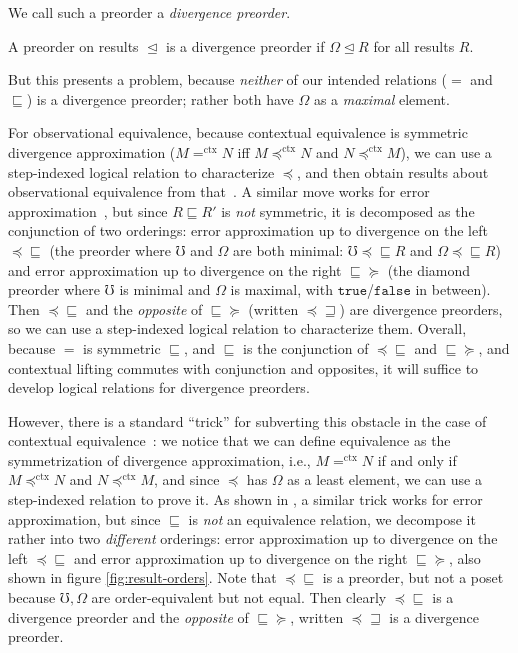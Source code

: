 \documentclass[acmsmall,screen,12pt]{acmart}
\newcommand{\ltdyn}{\sqsubseteq}
\newcommand{\gtdyn}{\sqsupseteq}
\newcommand{\apreorder}{\trianglelefteq}
\newcommand{\ctxize}[1]{\mathrel{{#1}^{\text{ctx}}}}
\newcommand{\tru}{\texttt{true}}
\newcommand{\fls}{\texttt{false}}
\newcommand{\err}{\mho}
\newcommand{\diverge}{\Omega}
\newcommand\errordivergeleft[0]{\preceq\ltdyn}
\newcommand\errordivergeright[0]{\ltdyn\succeq}
\newcommand\errordivergerightop[0]{\preceq\gtdyn}
\begin{document}
{\begin{longonly}
We call such a preorder a \emph{divergence preorder}.
\begin{definition}
  A preorder on results $\apreorder$ is a divergence preorder if
  $\diverge \apreorder R$ for all results $R$.
\end{definition}
\end{longonly}
%
But this presents a problem, because \emph{neither} of our intended
relations ($=$ and $\ltdyn$) is a divergence preorder; rather both have
$\diverge$ as a \emph{maximal} element.
%
\begin{shortonly}
  For observational equivalence, because contextual equivalence is
  symmetric divergence approximation ($M \ctxize= N$ iff $M
  \ctxize\preceq N$ and $N \ctxize\preceq M$), we can use a step-indexed
  logical relation to characterize $\preceq$, and then obtain results
  about observational equivalence from that~\cite{ahmed06:lr}.
  A similar move works for error
  approximation~\cite{newahmed18}, but since $R \ltdyn R'$ is \emph{not} symmetric, it is decomposed as the conjunction of two
  orderings: error approximation up to divergence on the left
  $\errordivergeleft$ (the preorder where $\err$ and $\diverge$ are both
  minimal: $\err \preceq\ltdyn R$ and $\diverge \preceq\ltdyn R$) and
  error approximation up to divergence on the right $\errordivergeright$
  (the diamond preorder where $\err$ is minimal and $\diverge$ is
  maximal, with $\tru$/$\fls$ in between).  Then $\preceq\ltdyn$ and the
  \emph{opposite} of $\ltdyn\succeq$ (written $\errordivergerightop$)
  are divergence preorders, so we can use a step-indexed logical
  relation to characterize them.  Overall, because $=$ is symmetric
  $\ltdyn$, and $\ltdyn$ is the conjunction of $\errordivergeleft$ and
  $\errordivergeright$, and contextual lifting commutes with conjunction
  and opposites, it will suffice to develop logical relations for
  divergence preorders.
\end{shortonly}

\begin{longonly}
However, there is a standard ``trick'' for subverting this obstacle in
the case of contextual equivalence~\cite{ahmed06:lr}: we notice
that we can define equivalence as the symmetrization of divergence
approximation, i.e., $M \ctxize= N$ if and only if $M \ctxize\preceq
N$ and $N \ctxize\preceq M$, and since $\preceq$ has $\diverge$ as
a least element, we can use a step-indexed relation to prove it.
%
As shown in \citet{newahmed18}, a similar trick works for error
approximation, but since $\ltdyn$ is \emph{not} an equivalence
relation, we decompose it rather into two \emph{different} orderings:
error approximation up to divergence on the left $\errordivergeleft$ and
error approximation up to divergence on the right $\errordivergeright$,
also shown in figure \ref{fig:result-orders}.
%
Note that $\errordivergeleft$ is a preorder, but not a poset because
$\err, \diverge$ are order-equivalent but not equal.
%
Then clearly $\errordivergeleft$ is a divergence preorder and the
\emph{opposite} of $\errordivergeright$, written $\errordivergerightop$
is a divergence preorder.


\end{longonly}}
\end{document}
